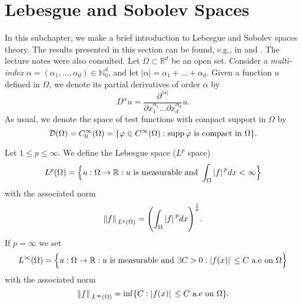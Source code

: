 \section{Lebesgue and Sobolev Spaces}\label{lebesgue_and_sobolev_preliminaries}
In this subchapter, we make a brief introduction to Lebesgue and Sobolev spaces theory. The results presented in this section can be found, e.g., in \cite{lions2012non} and \cite{evans2022partial}. The lecture notes \cite{huguinho} were also consulted. Let $\Omega \subset \mathbb{R}^d$ be an open set. Consider a \textit{multi-index} $\alpha = (\alpha_1, \dots, \alpha_d) \in \mathbb{N}_0^d$, and let $|\alpha| = \alpha_1 + \dots + \alpha_d$. Given a function \(u\) defined in $\Omega$, we denote its partial derivatives of order $\alpha$ by
\[
D^\alpha u = \frac{\partial^{|\alpha|}}{\partial x_1^{\alpha_1}\dots\partial x_d^{\alpha_d}}u.   
\]
As usual, we denote the space of test functions with compact support in $\Omega$ by
\[
\mathcal{D}(\Omega) = C_0^\infty(\Omega) = \{\varphi \in C^\infty(\Omega) : \operatorname{supp}\varphi \text{ is compact in }\Omega\}.
\]

\begin{definition}
    Let \(1 \leq p \leq \infty\). We define the Lebesgue space (\(L^p\) space)
    \[
        L^p(\Omega) = \Big\{u: \Omega \rightarrow \mathbb{R}: u \text{ is measurable and } \int_\Omega \abs*{f}^p dx < \infty\Big\}
    \]
    with the associated norm
    \[
        \norm*{f}_{L^p(\Omega)} = \Biggl(\int_\Omega \abs*{f}^p dx\Biggr)^{\frac{1}{p}}.
    \]
    If \(p=\infty\) we set
    \[
        L^\infty(\Omega) = \Big\{u: \Omega \rightarrow \mathbb{R}: u \text{ is measurable and } \exists C > 0: \abs*{f(x)} \leq C \text{ a.e on } \Omega \Big\}
    \]
    with the associated norm
    \[
        \norm*{f}_{L^\infty(\Omega)} = \inf \{C: \abs*{f(x)} \leq C \text{ a.e on } \Omega\}.
    \]
\end{definition}

